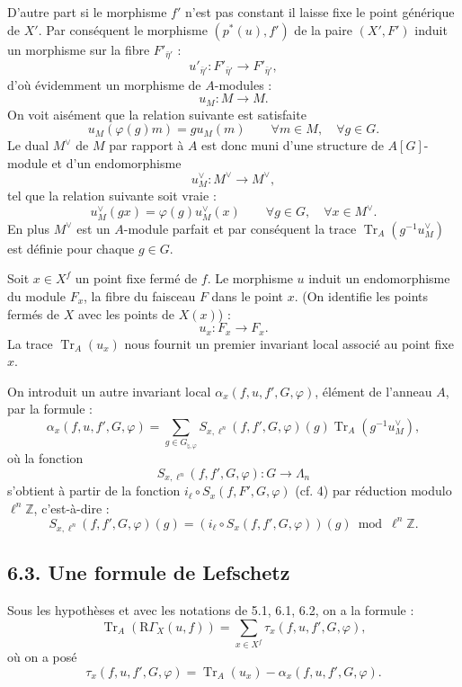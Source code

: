 \documentclass[11pt]{article}
\providecommand{\Tr}{\operatorname{Tr}}
\providecommand{\Tr}{\operatorname{Tr}}
\providecommand{\Tr}{\operatorname{Tr}}
\providecommand{\Tr}{\operatorname{Tr}}
\providecommand{\RG}{\mathrm R\Gamma}
\providecommand{\La}{\Lambda}
\providecommand{\bZ}{\mathbb Z}
\providecommand{\Tr}{\operatorname{Tr}}
\begin{document}
D'autre part si le morphisme $f'$ n'est pas constant il laisse fixe le point générique de $X'$. Par conséquent le morphisme $(p^*(u),f')$ de la paire $(X',F')$ induit un morphisme sur la fibre $F'_{\bar\eta'}$ :
\[
u'_{\bar\eta'}:F'_{\bar\eta'}\longrightarrow F'_{\bar\eta'} ,
\]
d'où évidemment un morphisme de $A$-modules :
\[
u_M:M\longrightarrow M .
\]
On voit aisément que la relation suivante est satisfaite
\begin{equation}\tag{6.2.1}
u_M(\varphi(g)m)=g u_M(m) \qquad \forall m\in M,\quad \forall g\in G .
\end{equation}
Le dual $M^\vee$ de $M$ par rapport à $A$ est donc muni d'une structure de $A[G]$-module et d'un endomorphisme
\[
u_M^\vee:M^\vee\longrightarrow M^\vee ,
\]
tel que la relation suivante soit vraie :
\[
u_M^\vee(gx)=\varphi(g)u_M^\vee(x) \qquad \forall g\in G,\quad \forall x\in M^\vee .
\]
En plus $M^\vee$ est un $A$-module parfait et par conséquent la trace $\Tr_A(g^{-1}u_M^\vee)$ est définie pour chaque $g\in G$.

Soit $x\in X^f$ un point fixe fermé de $f$. Le morphisme $u$ induit un endomorphisme du module $F_x$, la fibre du faisceau $F$ dans le point $x$. (On identifie les points fermés de $X$ avec les points de $X(x)$) :
\[
u_x:F_x\longrightarrow F_x .
\]
La trace $\Tr_A(u_x)$ nous fournit un premier invariant local associé au point fixe $x$.

On introduit un autre invariant local $\alpha_x(f,u,f',G,\varphi)$, élément de l'anneau $A$, par la formule :
\begin{equation}\tag{6.2.2}
\alpha_x(f,u,f',G,\varphi)=
\sum_{g\in G_{\natural,\varphi}}
S_{x,\ell^n}(f,f',G,\varphi)(g)\Tr_A(g^{-1}u_M^\vee),
\end{equation}
où la fonction
\[
S_{x,\ell^n}(f,f',G,\varphi):G\longrightarrow\La_n
\]
s'obtient à partir de la fonction $i_\ell\circ S_x(f,F',G,\varphi)$ (cf. 4) par réduction modulo $\ell^n\bZ$, c'est-à-dire :%
\[
S_{x,\ell^n}(f,f',G,\varphi)(g)=
(i_\ell\circ S_x(f,f',G,\varphi))(g)\bmod \ell^n\bZ.
\]

\subsection*{6.3. Une formule de Lefschetz}
Sous les hypothèses et avec les notations de 5.1, 6.1, 6.2, on a la formule :
\begin{equation}
\tag{6.3.1}
\Tr_A(\RG_X(u,f))=\sum_{x\in X^f}\tau_x(f,u,f',G,\varphi),
\end{equation}
où on a posé
\begin{equation}
\tag{6.3.2}
\tau_x(f,u,f',G,\varphi)=\Tr_A(u_x)-\alpha_x(f,u,f',G,\varphi).
\end{equation}
\end{document}
